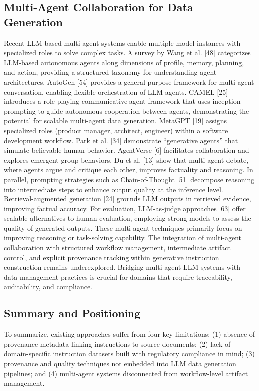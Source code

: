 \documentclass[9pt,twocolumn]{extarticle}
\begin{document}
\subsection{Multi-Agent Collaboration for Data Generation}
Recent LLM-based multi-agent systems enable multiple model instances
with specialized roles to solve complex tasks. A survey by Wang et al.
[48] categorizes LLM-based autonomous agents
along dimensions of profile, memory, planning, and action, providing a
structured taxonomy for understanding agent architectures. AutoGen
[54] provides a general-purpose framework for
multi-agent conversation, enabling flexible orchestration of LLM agents.
CAMEL [25] introduces a role-playing
communicative agent framework that uses inception prompting to guide
autonomous cooperation between agents, demonstrating the potential for
scalable multi-agent data generation. MetaGPT
[19] assigns specialized roles (product manager,
architect, engineer) within a software development workflow. Park et al.
[34] demonstrate ``generative agents'' that
simulate believable human behavior. AgentVerse [6]
facilitates collaboration and explores emergent group behaviors. Du et
al. [13] show that multi-agent debate, where
agents argue and critique each other, improves factuality and reasoning.
In parallel, prompting strategies such as Chain-of-Thought
[51] decompose reasoning into intermediate steps
to enhance output quality at the inference level. Retrieval-augmented
generation [24] grounds LLM outputs in retrieved
evidence, improving factual accuracy. For evaluation, LLM-as-judge
approaches [63] offer scalable alternatives to
human evaluation, employing strong models to assess the quality of
generated outputs.
These multi-agent techniques primarily focus on improving reasoning or
task-solving capability. The integration of multi-agent collaboration
with structured workflow management, intermediate artifact control, and
explicit provenance tracking within generative instruction construction
remains underexplored. Bridging multi-agent LLM systems with data
management practices is crucial for domains that require traceability,
auditability, and compliance.
\subsection{Summary and Positioning}
To summarize, existing approaches suffer from four key limitations: (1)
absence of provenance metadata linking instructions to source documents;
(2) lack of domain-specific instruction datasets built with regulatory
compliance in mind; (3) provenance and quality techniques not embedded
into LLM data generation pipelines; and (4) multi-agent systems
disconnected from workflow-level artifact management.
\end{document}
